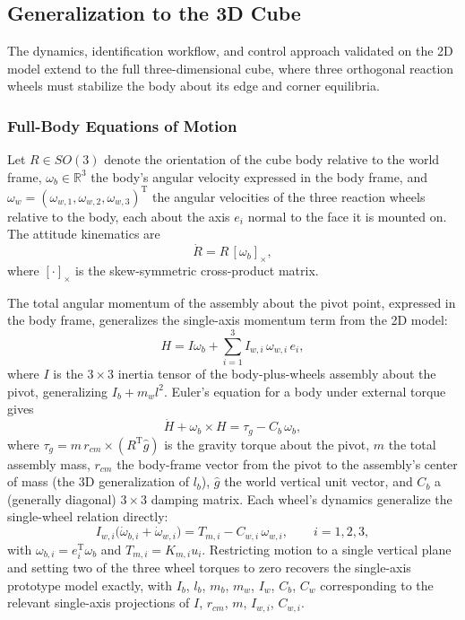
\subsection{Generalization to the 3D Cube}
\label{sec:3dmodel}

The dynamics, identification workflow, and control approach validated on the 2D
model extend to the full three-dimensional cube, where three orthogonal
reaction wheels must stabilize the body about its edge and corner equilibria.
\newpage
\subsubsection{Full-Body Equations of Motion}

Let $R \in SO(3)$ denote the orientation of the cube body relative to the world frame, $\omega_b \in \mathbb{R}^3$ the body's angular velocity expressed in the body frame, and $\omega_w = (\omega_{w,1},\omega_{w,2},\omega_{w,3})^{\mathrm T}$ the angular velocities of the three reaction wheels relative to the body, each about the axis $e_i$ normal to the face it is mounted on. The attitude kinematics are
\begin{equation}
\dot R = R\,[\omega_b]_\times,
\end{equation}
where $[\cdot]_\times$ is the skew-symmetric cross-product matrix.

The total angular momentum of the assembly about the pivot point, expressed in the body frame, generalizes the single-axis momentum term from the 2D model:
\begin{equation}
H = I\omega_b + \sum_{i=1}^{3} I_{w,i}\,\omega_{w,i}\,e_i,
\end{equation}
where $I$ is the $3\times3$ inertia tensor of the body-plus-wheels assembly about the pivot, generalizing $I_b + m_w l^2$. Euler's equation for a body under external torque gives
\begin{equation}
\dot H + \omega_b \times H = \tau_g - C_b\,\omega_b,
\end{equation}
where $\tau_g = m\,r_{cm}\times(R^{\mathrm T}\hat g)$ is the gravity torque about the pivot, $m$ the total assembly mass, $r_{cm}$ the body-frame vector from the pivot to the assembly's center of mass (the 3D generalization of $l_b$), $\hat g$ the world vertical unit vector, and $C_b$ a (generally diagonal) $3\times3$ damping matrix. Each wheel's dynamics generalize the single-wheel relation directly:
\begin{equation}
I_{w,i}\big(\dot\omega_{b,i} + \dot\omega_{w,i}\big) = T_{m,i} - C_{w,i}\,\omega_{w,i}, \qquad i=1,2,3,
\end{equation}
with $\omega_{b,i} = e_i^{\mathrm T}\omega_b$ and $T_{m,i} = K_{m,i}u_i$. Restricting motion to a single vertical plane and setting two of the three wheel torques to zero recovers the single-axis prototype model exactly, with $I_b$, $l_b$, $m_b$, $m_w$, $I_w$, $C_b$, $C_w$ corresponding to the relevant single-axis projections of $I$, $r_{cm}$, $m$, $I_{w,i}$, $C_{w,i}$.

